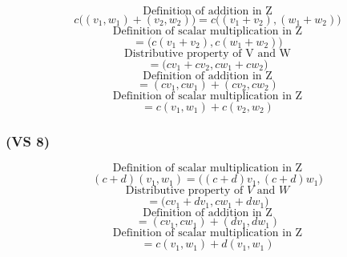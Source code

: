 \documentclass{article}
\begin{document}
\begin{equation*}
    \text{Definition of addition in Z}
\end{equation*}
\begin{equation*}
    c\Big((v_{1}, w_{1}) + (v_{2}, w_{2})\Big) = c\Big((v_{1} + v_{2}), (w_{1} + w_{2})\Big)
\end{equation*}
\begin{equation*}
    \text{Definition of scalar multiplication in Z}
\end{equation*}
\begin{equation*}
    = \Big(c(v_{1} + v_{2}), c(w_{1} + w_{2})\Big)
\end{equation*}
\begin{equation*}
    \text{Distributive property of V and W}
\end{equation*}
\begin{equation*}
   = \Big(cv_{1} + cv_{2}, cw_{1} + cw_{2}\Big)
\end{equation*}
\begin{equation*}
    \text{Definition of addition in Z}
\end{equation*}
\begin{equation*}
   = (cv_{1}, cw_{1}) + (cv_{2}, cw_{2})
\end{equation*}
\begin{equation*}
    \text{Definition of scalar multiplication in Z}
\end{equation*}
\begin{equation*}
    = c(v_{1}, w_{1}) + c(v_{2}, w_{2})
\end{equation*}

\subsubsection*{(VS 8)}

\begin{equation*}
    \text{Definition of scalar multiplication in Z}
\end{equation*}
\begin{equation*}
   (c + d)(v_{1}, w_{1}) = \Big((c + d)v_{1}, (c+d)w_{1}\Big)
\end{equation*}
\begin{equation*}
    \text{Distributive property of \(V\) and \(W\)}
\end{equation*}
\begin{equation*}
   = \Big(cv_{1} + dv_{1}, cw_{1} + dw_{1}\Big)
\end{equation*}
\begin{equation*}
    \text{Definition of addition in Z}
\end{equation*}
\begin{equation*}
   = (cv_{1}, cw_{1}) + (dv_{1}, dw_{1})
\end{equation*}
\begin{equation*}
    \text{Definition of scalar multiplication in Z}
\end{equation*}
\begin{equation*}
    = c(v_{1}, w_{1}) + d(v_{1}, w_{1})
\end{equation*}
\end{document}
